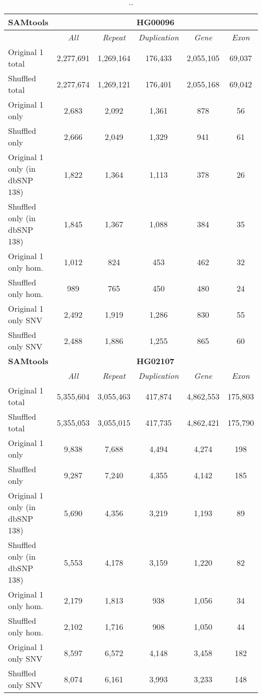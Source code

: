 \begin{table}[htb]
\caption{ .. }
\begin{center}
\begin{tabular}{|l|c||c|c|c|c|}
\hline
{\bf SAMtools} & \multicolumn{5}{|c|}{\bf HG00096} \\
\hline
\cline{2-6}
{\bf} & {\it All} & {\it Repeat} & {\it Duplication} & {\it Gene} & {\it Exon} \\
\hline
Original 1 total & 2,277,691 & 1,269,164 & 176,433 & 2,055,105 & 69,037 \\
\hline
Shuffled total & 2,277,674 & 1,269,121 & 176,401 & 2,055,168 & 69,042 \\
\hline
Original 1 only & 2,683 & 2,092 & 1,361 & 878 & 56 \\
\hline
Shuffled only & 2,666 & 2,049 & 1,329 & 941 & 61 \\
\hline
Original 1 only (in dbSNP 138) & 1,822 & 1,364 & 1,113 & 378 & 26 \\
\hline
Shuffled only (in dbSNP 138) & 1,845 & 1,367 & 1,088 & 384 & 35 \\
\hline
Original 1 only hom. & 1,012 & 824 & 453 & 462 & 32 \\
\hline
Shuffled only hom. & 989 & 765 & 450 & 480 & 24 \\
\hline
Original 1 only SNV & 2,492 & 1,919 & 1,286 & 830 & 55 \\
\hline
Shuffled only SNV & 2,488 & 1,886 & 1,255 & 865 & 60 \\ 
\hline
\hline
{\bf SAMtools} & \multicolumn{5}{|c|}{\bf HG02107} \\
\hline
\cline{2-6}
{\bf} & {\it All} & {\it Repeat} & {\it Duplication} & {\it Gene} & {\it Exon} \\
\hline
Original 1 total & 5,355,604 & 3,055,463 & 417,874 & 4,862,553 & 175,803 \\
\hline
Shuffled total & 5,355,053 & 3,055,015 & 417,735 & 4,862,421 & 175,790 \\
\hline
Original 1 only & 9,838 & 7,688 & 4,494 & 4,274 & 198 \\
\hline
Shuffled only & 9,287 & 7,240 & 4,355 & 4,142 & 185 \\
\hline
Original 1 only (in dbSNP 138) & 5,690 & 4,356 & 3,219 & 1,193 & 89 \\
\hline
Shuffled only (in dbSNP 138) & 5,553 & 4,178 & 3,159 & 1,220 & 82 \\
\hline
Original 1 only hom. & 2,179 & 1,813 & 938 & 1,056 & 34 \\
\hline
Shuffled only hom. & 2,102 & 1,716 & 908 & 1,050 & 44 \\
\hline
Original 1 only SNV & 8,597 & 6,572 & 4,148 & 3,458 & 182 \\
\hline
Shuffled only SNV & 8,074 & 6,161 & 3,993 & 3,233 & 148 \\ 
\hline
\end{tabular}
\end{center}
\label{tab:orig-vs-shuf-samtools}
\end{table}

